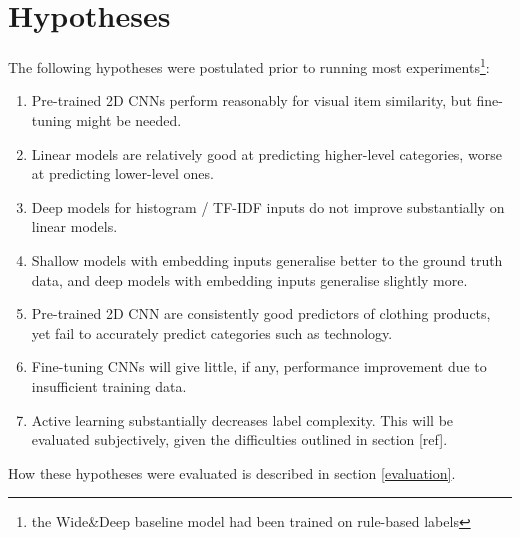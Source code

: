 \section{Hypotheses}

The following hypotheses were postulated prior to running most experiments\footnote{the Wide\&Deep baseline model had been trained on rule-based labels}:

\begin{enumerate}
  \item Pre-trained 2D CNNs perform reasonably for visual item similarity, but fine-tuning might be needed.
  \item Linear models are relatively good at predicting higher-level categories, worse at predicting lower-level ones.
  \item Deep models for histogram / TF-IDF inputs do not improve substantially on linear models.
  \item Shallow models with embedding inputs generalise better to the ground truth data, and deep models with embedding inputs generalise slightly more.
  \item Pre-trained 2D CNN are consistently good predictors  of clothing products, yet fail to accurately predict categories such as technology.
  \item Fine-tuning CNNs  will give little, if any,  performance  improvement due to insufficient training data.


  \item Active learning substantially decreases label complexity.  This will be evaluated subjectively, given the  difficulties outlined in section [ref].
\end{enumerate}

\hfill \break
How these hypotheses were evaluated is described in section \ref{evaluation}.


